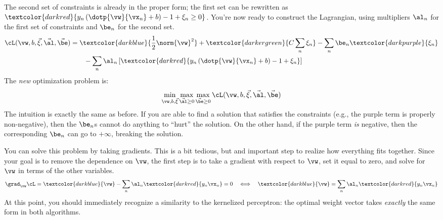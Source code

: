The second set of constraints is already in the proper form; the first
set can be rewritten as $\textcolor{darkred}{y_n \left(
    \dotp{\vw}{\vx_n} + b \right) - 1 + \xi_n \geq 0}$.  You're now
ready to construct the Lagrangian, using multipliers $\al_n$ for the
first set of constraints and $\be_n$ for the second set.
%
\begin{align}
\cL(\vw,b,\vec\xi,\vec\al,\vec\be)
&=
  \textcolor{darkblue}{\frac 1 2 \norm{\vw}^2}
+ \textcolor{darkergreen}{C \sum_n \xi_n}
- \sum_n \be_n \textcolor{darkpurple}{\xi_n}
\\&\qquad
- \sum_n \al_n \left[
    \textcolor{darkred}{y_n \left( \dotp{\vw}{\vx_n} + b \right) - 1 + \xi_n}
  \right]
\end{align}
%
The \emph{new} optimization problem is:
%
\begin{align}
\min_{\vw,b,\vec\xi} \max_{\vec\al \geq 0} \max_{\vec\be \geq 0} \cL(\vw,b,\vec\xi,\vec\al,\vec\be)
\end{align}
%
The intuition is exactly the same as before.  If you are able to find
a solution that satisfies the constraints (e.g., the purple term is
properly non-negative), then the $\be_n$s cannot do anything to
``hurt'' the solution.  On the other hand, if the purple term
\emph{is} negative, then the corresponding $\be_n$ can go to
$+\infty$, breaking the solution.

You can solve this problem by taking gradients.  This is a bit
tedious, but and important step to realize how everything fits
together.  Since your goal is to remove the dependence on $\vw$, the
first step is to take a gradient with respect to $\vw$, set it equal
to zero, and solve for $\vw$ in terms of the other variables.
%
\begin{align}
\grad_{\vw} \cL
= \textcolor{darkblue}{\vw}
  - \sum_n \al_n \textcolor{darkred}{y_n \vx_n}
= 0 \quad\Longleftrightarrow\quad
\textcolor{darkblue}{\vw}
= \sum_n \al_n \textcolor{darkred}{y_n \vx_n}
\end{align}
%
At this point, you should immediately recognize a similarity to the
kernelized perceptron: the optimal weight vector takes \emph{exactly}
the same form in both algorithms.

